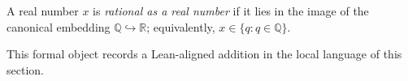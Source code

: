 \begin{remark*}
A real number $x$ is \emph{rational as a real number} if it lies in the image of the canonical embedding $\mathbb Q\hookrightarrow\mathbb R$; equivalently, $x\in\{q:q\in\mathbb Q\}$.
\end{remark*}

\begin{remark*}[Interpretation]
This formal object records a Lean-aligned addition in the local language of this section.
\end{remark*}

\begin{dependencies}
\NoLocalDependencies
\end{dependencies}
